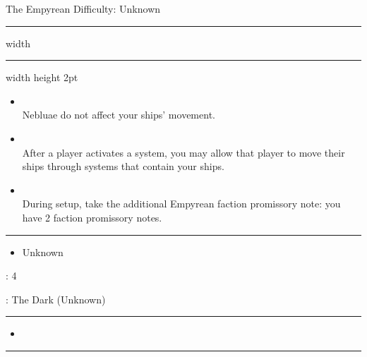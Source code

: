 {\handel\Huge The Empyrean} \hfill {\Large Difficulty: Unknown} \vspace{-4pt}\\
\hrule width \hsize \kern 1mm \hrule width \hsize height 2pt


\begin{multicols}{2}


\begin{itemize}
\item {}\\
Nebluae do not affect your ships' movement.
\item {}\\
After a player activates a system, you may allow that player to move their ships through systems that contain your ships.
\item {}\\
During setup, take the additional Empyrean faction promissory note: you have 2 faction promissory notes.
\end{itemize}


\vspace{-10pt}\rule{\hsize}{0.4pt}\vspace{5pt}


\vspace{-5pt}
\begin{multicols}{2}
\begin{itemize}
\item Unknown %
\end{itemize}
\end{multicols}

\vspace{-5pt}
: 4

\vspace{2pt}
: The Dark (Unknown) %

\rule{\hsize}{0.4pt}\vspace{5pt}


\begin{itemize}
\item \tap
\end{itemize}

\vspace{-10pt}\rule{\hsize}{0.4pt}\vspace{5pt}


\end{multicols}
